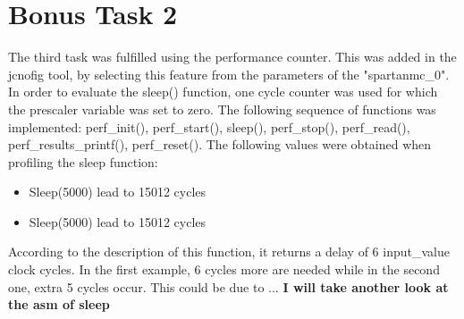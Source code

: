 
	\section{Bonus Task 2} %
	\label{sec:impl_bonus_task_2}
		The third task was fulfilled using the performance counter. This was added in the jcnofig tool, by selecting this feature from the parameters of the "spartanmc\_0". In order to evaluate the sleep() function, one cycle counter was used for which the prescaler variable was set to zero. The following sequence of functions was implemented: perf\_init(\*), perf\_start(\*), sleep(\*), perf\_stop(\*), perf\_read(\*), perf\_results\_printf(\*), perf\_reset(). The following values were obtained when profiling the sleep function:
		\begin{itemize}
			\item Sleep(5000)  lead to 15012 cycles
			\item Sleep(5000)  lead to 15012 cycles
		\end{itemize}
		According to the description of this function, it returns a delay of 6  \* input\_value clock cycles. In the first example, 6 cycles more are needed while in the second one, extra 5 cycles occur. This could be due to ... \textbf{I will take another look at the asm of sleep}
